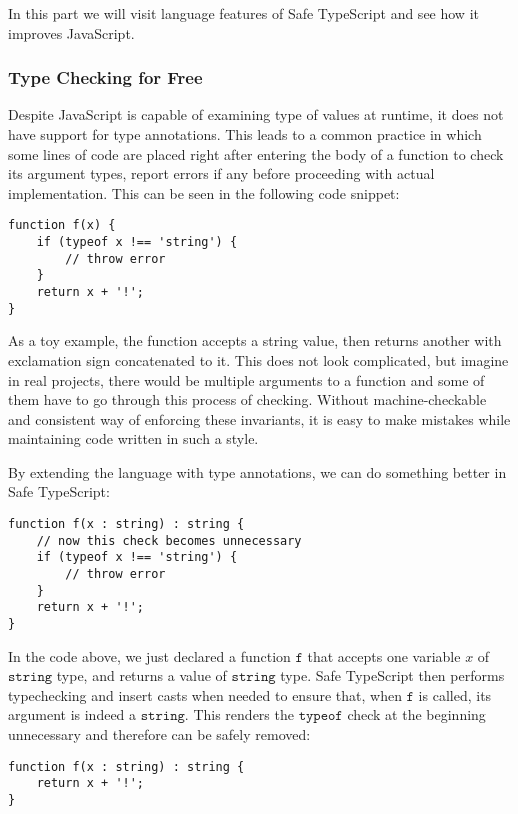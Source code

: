 In this part we will visit language features of Safe TypeScript and
see how it improves JavaScript.

\subsubsection{Type Checking for Free}

Despite JavaScript is capable of examining type of values at runtime,
it does not have support for type annotations.
This leads to a common practice in which some lines of code are placed
right after entering the body of a function
to check its argument types, report errors if any before
proceeding with actual implementation.
This can be seen in the following code snippet:

\begin{verbatim}
function f(x) {
    if (typeof x !== 'string') {
        // throw error
    }
    return x + '!';
}
\end{verbatim}

As a toy example, the function accepts a string value,
then returns another with exclamation sign concatenated to it.
This does not look complicated, but imagine in real projects,
there would be multiple arguments to a function and some of them have to
go through this process of checking.
Without machine-checkable and consistent way of enforcing these invariants,
it is easy to make mistakes while maintaining code written in such a style.

By extending the language with type annotations,
we can do something better in Safe TypeScript:

\begin{verbatim}
function f(x : string) : string {
    // now this check becomes unnecessary
    if (typeof x !== 'string') {
        // throw error
    }
    return x + '!';
}
\end{verbatim}

In the code above, we just declared a function $\texttt{f}$ that accepts
one variable $x$ of $\texttt{string}$ type, and returns a value of $\texttt{string}$ type.
Safe TypeScript then performs typechecking and insert casts when needed to ensure that,
when $\texttt{f}$ is called, its argument is indeed a $\texttt{string}$.
This renders the $\texttt{typeof}$ check at the beginning unnecessary
and therefore can be safely removed:

\begin{verbatim}
function f(x : string) : string {
    return x + '!';
}
\end{verbatim}

